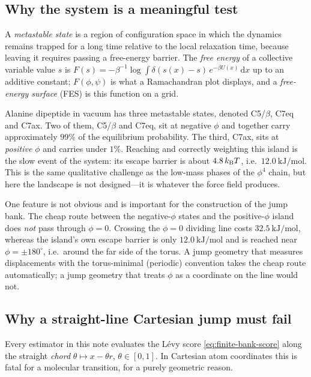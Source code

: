 \documentclass[11pt]{article}
\newcommand{\dd}{\,\mathrm{d}}
\begin{document}
\subsection{Why the system is a meaningful test}
\label{app:e5-difficulty}

A \emph{metastable state} is a region of configuration space in which the
dynamics remains trapped for a long time relative to the local relaxation time,
because leaving it requires passing a free-energy barrier.  The \emph{free
energy} of a collective variable value $s$ is
$F(s)=-\beta^{-1}\log\int\delta(s(x)-s)\,e^{-\beta U(x)}\dd x$ up to an
additive constant; $F(\phi,\psi)$ is what a Ramachandran plot displays, and a
\emph{free-energy surface} (FES) is this function on a grid.

Alanine dipeptide in vacuum has three metastable states, denoted C5/$\beta$,
C7eq and C7ax.  Two of them, C5/$\beta$ and C7eq, sit at negative $\phi$ and
together carry approximately $99\%$ of the equilibrium probability.  The third,
C7ax, sits at \emph{positive} $\phi$ and carries under $1\%$.  Reaching and
correctly weighting this island is the slow event of the system: its escape
barrier is about $4.8\,k_{\rm B}T$, i.e.\ $12.0\ \mathrm{kJ/mol}$.  This is the
same qualitative challenge as the low-mass phases of the $\phi^4$ chain, but
here the landscape is not designed---it is whatever the force field produces.

One feature is not obvious and is important for the construction of the jump
bank.  The cheap route between the negative-$\phi$ states and the positive-$\phi$
island does \emph{not} pass through $\phi=0$.  Crossing the $\phi=0$ dividing
line costs $32.5\ \mathrm{kJ/mol}$, whereas the island's own escape barrier is
only $12.0\ \mathrm{kJ/mol}$ and is reached near $\phi=\pm180^\circ$, i.e.\
around the far side of the torus.  A jump geometry that measures displacements
with the torus-minimal (periodic) convention takes the cheap route
automatically; a jump geometry that treats $\phi$ as a coordinate on the line
would not.

\subsection{Why a straight-line Cartesian jump must fail}
\label{app:e5-chord}

Every estimator in this note evaluates the L\'evy score
\eqref{eq:finite-bank-score} along the straight \emph{chord}
$\theta\mapsto x-\theta r$, $\theta\in[0,1]$.  In Cartesian atom coordinates
this is fatal for a molecular transition, for a purely geometric reason.
\end{document}
